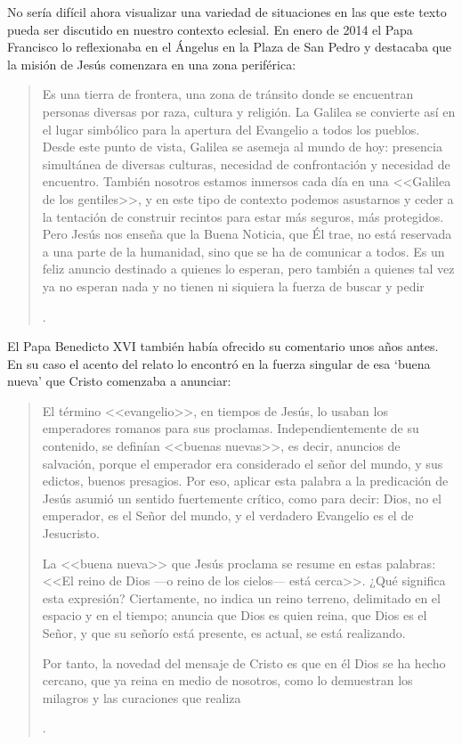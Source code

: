 No sería difícil ahora visualizar una variedad de situaciones en las que este texto pueda ser discutido en nuestro contexto eclesial. En enero de 2014 el Papa Francisco lo reflexionaba en el Ángelus en la Plaza de San Pedro y destacaba que la misión de Jesús comenzara en una zona periférica:
\blockquote[{\Cite{francisco2014angelus}}.]{Es una tierra de frontera, una zona de tránsito donde se encuentran personas diversas por raza, cultura y religión. La Galilea se convierte así en el lugar simbólico para la apertura del Evangelio a todos los pueblos. Desde este punto de vista, Galilea se asemeja al mundo de hoy: presencia simultánea de diversas culturas, necesidad de confrontación y necesidad de encuentro. También nosotros estamos inmersos cada día en una <<Galilea de los gentiles>>, y en este tipo de contexto podemos asustarnos y ceder a la tentación de construir recintos para estar más seguros, más protegidos. Pero Jesús nos enseña que la Buena Noticia, que Él trae, no está reservada a una parte de la humanidad, sino que se ha de comunicar a todos. Es un feliz anuncio destinado a quienes lo esperan, pero también a quienes tal vez ya no esperan nada y no tienen ni siquiera la fuerza de buscar y pedir}.

El Papa Benedicto XVI también había ofrecido su comentario unos años antes. En su caso el acento del relato lo encontró en la fuerza singular de esa `buena nueva' que Cristo comenzaba a anunciar:
\blockquote[{\Cite{benedicto2008angelus}}.]{El término <<evangelio>>, en tiempos de Jesús, lo usaban los emperadores romanos para sus proclamas. Independientemente de su contenido, se definían <<buenas nuevas>>, es decir, anuncios de salvación, porque el emperador era considerado el señor del mundo, y sus edictos, buenos presagios. Por eso, aplicar esta palabra a la predicación de Jesús asumió un sentido fuertemente crítico, como para decir: Dios, no el emperador, es el Señor del mundo, y el verdadero Evangelio es el de Jesucristo.

La <<buena nueva>> que Jesús proclama se resume en estas palabras: <<El reino de Dios ---o reino de los cielos--- está cerca>>. ¿Qué significa esta expresión? Ciertamente, no indica un reino terreno, delimitado en el espacio y en el tiempo; anuncia que Dios es quien reina, que Dios es el Señor, y que su señorío está presente, es actual, se está realizando.

Por tanto, la novedad del mensaje de Cristo es que en él Dios se ha hecho cercano, que ya reina en medio de nosotros, como lo demuestran los milagros y las curaciones que realiza}.

